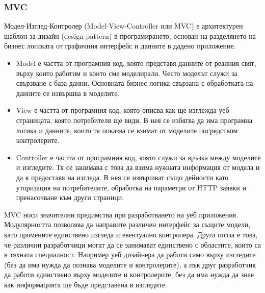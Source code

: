 \documentclass[pdftex,14pt,a4paper]{extreport}
\begin{document}
\subsubsection {MVC}
Модел-Изглед-Контролер (Model-View-Controller или MVC) е архитектурен шаблон за дизайн (design pattern) в програмирането, основан на разделянето на бизнес логиката от графичния интерфейс и данните в дадено приложение.
\begin{itemize}
  \item Model е частта от програмния код, която представя данните от реалния свят, върху които работим и които сме моделирали. Често моделът служи за свързване с база данни. Основната бизнес логика свързана с обработката на данните се извършва в моделите.
  \item View е частта от програмния код, която описва как ще изглежда уеб страницата, която потребителя ще види. В нея се избягва да има програмна логика и данните, които тя показва се взимат от моделите посредством контролерите.
  \item Controller е частта от програмния код, която служи за връзка между моделите и изгледите. Тя се занимава с това да взима нужната информация от модела и да я предоставя на изгледа. В нея се извършват също дейности като уторизация на потребителите, обработка на параметри от HTTP заявки и пренасочване към други страници.
\end{itemize}
MVC носи значителни предимства при разработването на уеб приложения. Модулярността позволява да направите различен интерфейс за същите модели, като промените единствено изгледа и евентуално контролера. Друга полза е това, че различни разработчици могат да се занимават единствено с областите, които са в тяхната специалност. Например уеб дизайнера да работи само върху изгледите (без да има нужда да познава моделите и контролерите), а пък друг разработчик да работи единствено върху моделите и контролерите, без да има нужда да знае как информацията ще бъде представена в изгледите.
\end{document}
